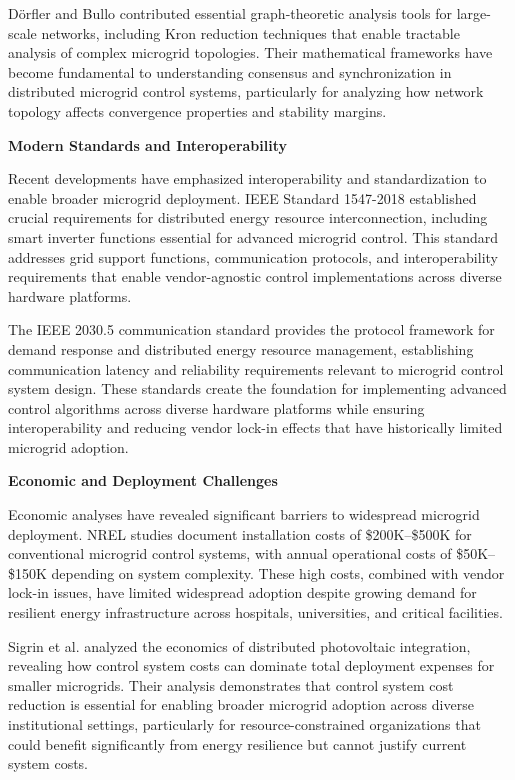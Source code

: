\documentclass[12pt]{article}
\begin{document}
Dörfler and Bullo \cite{dorfler2013} contributed essential graph-theoretic analysis tools for large-scale networks, including Kron reduction techniques that enable tractable analysis of complex microgrid topologies. Their mathematical frameworks have become fundamental to understanding consensus and synchronization in distributed microgrid control systems, particularly for analyzing how network topology affects convergence properties and stability margins.

\textbf{Modern Standards and Interoperability}

Recent developments have emphasized interoperability and standardization to enable broader microgrid deployment. IEEE Standard 1547-2018 \cite{ieee1547} established crucial requirements for distributed energy resource interconnection, including smart inverter functions essential for advanced microgrid control. This standard addresses grid support functions, communication protocols, and interoperability requirements that enable vendor-agnostic control implementations across diverse hardware platforms.

The IEEE 2030.5 communication standard \cite{ieee2030} provides the protocol framework for demand response and distributed energy resource management, establishing communication latency and reliability requirements relevant to microgrid control system design. These standards create the foundation for implementing advanced control algorithms across diverse hardware platforms while ensuring interoperability and reducing vendor lock-in effects that have historically limited microgrid adoption.

\textbf{Economic and Deployment Challenges}

Economic analyses have revealed significant barriers to widespread microgrid deployment. NREL studies \cite{anderson2021,hirsch2018} document installation costs of \$200K--\$500K for conventional microgrid control systems, with annual operational costs of \$50K--\$150K depending on system complexity. These high costs, combined with vendor lock-in issues, have limited widespread adoption despite growing demand for resilient energy infrastructure across hospitals, universities, and critical facilities.

Sigrin et al. \cite{sigrin2016} analyzed the economics of distributed photovoltaic integration, revealing how control system costs can dominate total deployment expenses for smaller microgrids. Their analysis demonstrates that control system cost reduction is essential for enabling broader microgrid adoption across diverse institutional settings, particularly for resource-constrained organizations that could benefit significantly from energy resilience but cannot justify current system costs.
\end{document}
